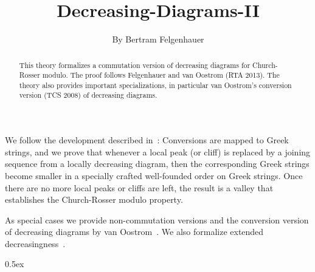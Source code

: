 \documentclass[11pt,a4paper]{article}
\begin{document}
\title{Decreasing-Diagrams-II}
\author{By Bertram Felgenhauer}
\maketitle

\begin{abstract}
This theory formalizes a commutation version of decreasing diagrams for Church-Rosser modulo.
The proof follows Felgenhauer and van Oostrom (RTA 2013). The theory also provides important
specializations, in particular van Oostrom's conversion version (TCS 2008) of decreasing diagrams.
\end{abstract}

We follow the development described in~\cite{FvO13}: Conversions are mapped to Greek strings, and
we prove that whenever a local peak (or cliff) is replaced by a joining sequence from a locally
decreasing diagram, then the corresponding Greek strings become smaller in a specially crafted
well-founded order on Greek strings. Once there are no more local peaks or cliffs are left, the
result is a valley that establishes the Church-Rosser modulo property.

As special cases we provide non-commutation versions and the conversion version of decreasing
diagrams by van Oostrom~\cite{vO08a}. We also formalize extended decreasingness~\cite{HM10}.

\tableofcontents

\parindent 0pt\parskip 0.5ex





\end{document}
